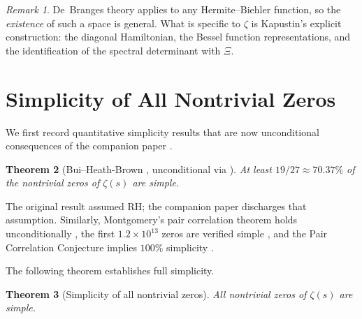 \documentclass[11pt,a4paper]{amsart}
\newtheorem{theorem}{Theorem}[section]
\theoremstyle{definition}
\theoremstyle{remark}
\newtheorem{remark}[theorem]{Remark}
\begin{document}
\begin{remark}
De~Branges theory applies to any Hermite--Biehler function, so the \emph{existence} of such a space is general. What is specific to $\zeta$ is Kapustin's explicit construction: the diagonal Hamiltonian, the Bessel function representations, and the identification of the spectral determinant with $\Xi$.
\end{remark}

\section{Simplicity of All Nontrivial Zeros}\label{sec:simplicity}

We first record quantitative simplicity results that are now unconditional consequences of the companion paper \cite{Shr26c}.

\begin{theorem}[Bui--Heath-Brown {\cite{BHB13}}, unconditional via {\cite{Shr26c}}]\label{thm:BHB}
At least $19/27 \approx 70.37\%$ of the nontrivial zeros of $\zeta(s)$ are simple.
\end{theorem}

The original result assumed RH; the companion paper \cite{Shr26c} discharges that assumption. Similarly, Montgomery's pair correlation theorem holds unconditionally \cite{BGSTB24}, the first $1.2\times 10^{13}$ zeros are verified simple \cite{PT21}, and the Pair Correlation Conjecture implies $100\%$ simplicity \cite{GM78}.

The following theorem establishes full simplicity.

\begin{theorem}[Simplicity of all nontrivial zeros]\label{thm:simplicity}
All nontrivial zeros of $\zeta(s)$ are simple.
\end{theorem}
\end{document}
